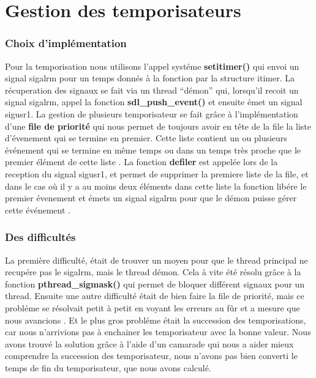 \documentclass[a4paper]{article}
\begin{document}
\part{Gestion des temporisateurs}

\section{Choix d'implémentation}
Pour la temporisation nous utilisons l'appel systéme \textbf{setitimer()} qui envoi un signal sigalrm pour un temps donnés à la fonction par la structure itimer.
\newline La récuperation des signaux se fait via un thread ``démon'' qui, lorsqu'il recoit un signal sigalrm, appel la fonction \textbf{sdl\_push\_event()} et ensuite émet un signal sigusr1.
\newline La gestion de plusieurs temporisateur se fait grâce à l'implémentation d'une \textbf{file de priorité} qui nous permet de toujours avoir en tête de la file la liste d'évenement qui se termine en premier. Cette liste contient un ou plusieurs événement qui se termine en même temps ou dans un temps très proche que le premier élément de cette liste .
\newline La fonction \textbf{defiler} est appelée lors de la reception du signal sigusr1, et permet de supprimer la premiere liste de la file, et dans le cas où il y a au moins deux éléments dans cette liste la fonction libére le premier évenement et émets un signal sigalrm pour que le démon puisse gérer cette événement . 

\section{Des difficultés}
La première difficulté, était de trouver un moyen pour que le thread principal ne recupére pas le sigalrm, mais le thread démon. Cela à vite été résolu grâce à la fonction \textbf{pthread\_sigmask()} qui permet de bloquer différent signaux pour un thread.
\newline Ensuite une autre difficulté était de bien faire la file de priorité, mais ce probléme se résolvait petit à petit en voyant les erreurs au fûr et a mesure que nous avancions .
\newline Et le plus gros probléme était la succession des temporisations, car nous n'arrivions pas à enchainer les temporisateur avec la bonne valeur. Nous avons trouvé la solution grâce à l'aide d'un camarade qui nous a aider mieux comprendre la succession des temporisateur, nous n'avons pas bien converti le temps de fin du temporisateur, que nous avons calculé.
\end{document}
